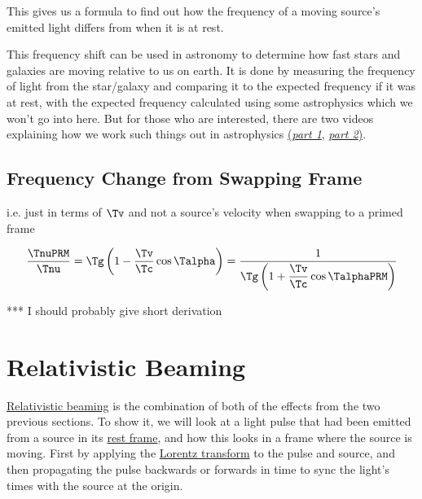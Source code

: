 This gives us a formula to find out how the frequency of a moving source's emitted light differs from when it is at rest.

This frequency shift can be used in astronomy to determine how fast stars and galaxies are moving relative to us on earth.
It is done by measuring the frequency of light from the star/galaxy and comparing it to the expected frequency if it was at rest, with the expected frequency calculated using some astrophysics which we won't go into here.
But for those who are interested, there are two videos explaining how we work such things out in astrophysics \href{https://www.youtube.com/watch?v=YdOXS_9_P4U}{(\textit{part 1}}, \href{https://www.youtube.com/watch?v=hFMaT9oRbs4}{\textit{part 2})}.

\subsection{Frequency Change from Swapping Frame}\label{subsect: Frequency Change from Swaping Frame}

i.e. just in terms of $\Tv $ and not a source's velocity when swapping to a primed frame

\begin{equation}
	\frac{\TnuPRM }{\Tnu } = \Tg  \left(1-\dfrac{\Tv }{\Tc } \cos\Talpha  \right)  = \frac{1}{ \Tg  \left(1+\dfrac{\Tv }{\Tc } \cos\TalphaPRM  \right)}
\end{equation}

*** I should probably give short derivation


\section{Relativistic Beaming} \label{sect: Relativistic Beaming}

\hyperlink{def-relativistic-beaming}{Relativistic beaming} is the combination of both of the effects from the two previous sections.
To show it, we will look at a light pulse that had been emitted from a source in its \hyperlink{def-proper-frame}{rest frame}, and how this looks in a frame where the source is moving.
First by applying the \hyperlink{def-lorentz-transform}{Lorentz transform} to the pulse and source, and then propagating the pulse backwards or forwards in time to sync the light's times with the source at the origin.

